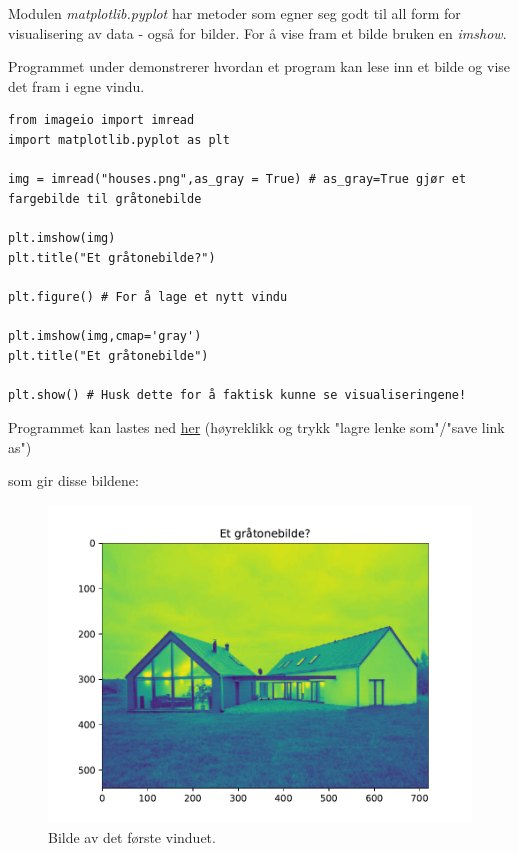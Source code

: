 \documentclass[%
oneside,                 %
final,                   %
10pt]{article}
\begin{document}
Modulen \emph{matplotlib.pyplot} har metoder som egner seg godt til all form for visualisering av data - også for bilder. For å vise fram et bilde bruken en \emph{imshow}.

Programmet under demonstrerer hvordan et program kan lese inn et bilde og vise det fram i egne vindu.
\begin{verbatim}
from imageio import imread
import matplotlib.pyplot as plt

img = imread("houses.png",as_gray = True) # as_gray=True gjør et fargebilde til gråtonebilde

plt.imshow(img)
plt.title("Et gråtonebilde?")

plt.figure() # For å lage et nytt vindu

plt.imshow(img,cmap='gray')
plt.title("Et gråtonebilde")

plt.show() # Husk dette for å faktisk kunne se visualiseringene!
\end{verbatim}
Programmet kan lastes ned \href{{https://github.com/krisbhei/INF2310/raw/master/Programmering/Python/fremvising.py}}{her} (høyreklikk og trykk "lagre lenke som"/"save link as")

som gir disse bildene:


\begin{figure}[!ht]  %
  \centerline{\includegraphics[width=0.9\linewidth]{Figure_1.pdf}}
  \caption{
  Bilde av det første vinduet.
  }
\end{figure}
\end{document}
